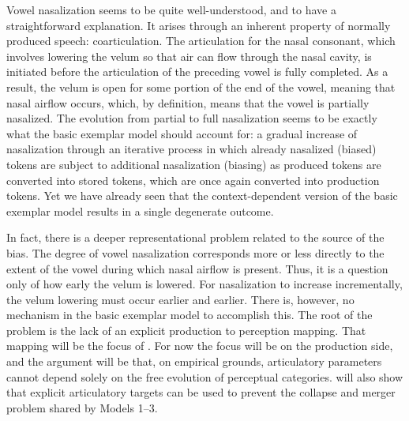 Vowel nasalization seems to be quite well-understood, and to have
a straightforward explanation. It arises through an inherent property
of normally produced speech: coarticulation. The articulation for
the nasal consonant, which involves lowering the velum so that air
can flow through the nasal cavity, is initiated before the articulation
of the preceding vowel is fully completed. As a result, the velum
is open for some portion of the end of the vowel, meaning that nasal
airflow occurs, which, by definition, means that the vowel is partially
nasalized. The evolution from partial to full nasalization seems to
be exactly what the basic exemplar model should account for: a gradual
increase of nasalization through an iterative process in which already
nasalized (biased) tokens are subject to additional nasalization (biasing)
as produced tokens are converted into stored tokens, which are once
again converted into production tokens. Yet we have already seen that
the context-dependent version of the basic exemplar model results
in a single degenerate outcome. 

In fact, there is a deeper representational problem related to the
source of the bias. The degree of vowel nasalization corresponds more
or less directly to the extent of the vowel during which nasal airflow
is present. Thus, it is a question only of how early the velum is
lowered. For nasalization to increase incrementally, the velum lowering
must occur earlier and earlier. There is, however, no mechanism in
the basic exemplar model to accomplish this. The root of the problem
is the lack of an explicit production to perception mapping. That
mapping will be the focus of .
For now the focus will be on the production side, and the argument
will be that, on empirical grounds, articulatory parameters cannot
depend solely on the free evolution of perceptual categories. 
 will also show that explicit articulatory
targets can be used to prevent the collapse and merger problem shared
by Models 1--3.
